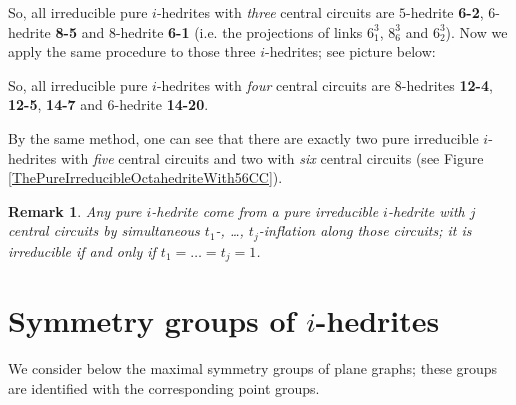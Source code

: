 \documentclass[12pt]{article}
\newtheorem{remark}{Remark}
\begin{document}
\begin{center}
\epsfxsize=120mm
\end{center}

So, all irreducible pure $i$-hedrites with {\em three} central circuits are $5$-hedrite {\bf 6-2}, $6$-hedrite {\bf 8-5} and $8$-hedrite {\bf 6-1} (i.e. the projections of links $6^3_1$, $8^3_6$ and $6^3_2$).
Now we apply the same procedure to those three $i$-hedrites; see picture below:

\begin{center}
\epsfxsize=150mm
\end{center}

So, all irreducible pure $i$-hedrites with {\em four} central circuits are $8$-hedrites {\bf 12-4}, {\bf 12-5}, {\bf 14-7} and $6$-hedrite {\bf 14-20}.

By the same method, one can see that there are exactly two pure irreducible $i$-hedrites with {\em five} central circuits and two with {\em six} central circuits (see Figure \ref{ThePureIrreducibleOctahedriteWith56CC}).


\begin{remark}

Any pure $i$-hedrite come from a pure irreducible $i$-hedrite with $j$ central circuits by simultaneous $t_1$-, \dots, $t_j$-inflation along those circuits; it is irreducible if and only if $t_1=\dots=t_j=1$.

\end{remark}






\section{Symmetry groups of $i$-hedrites}
We consider below the maximal symmetry groups of plane graphs; these groups are identified with the corresponding point groups.



%
%
%
\end{document}
